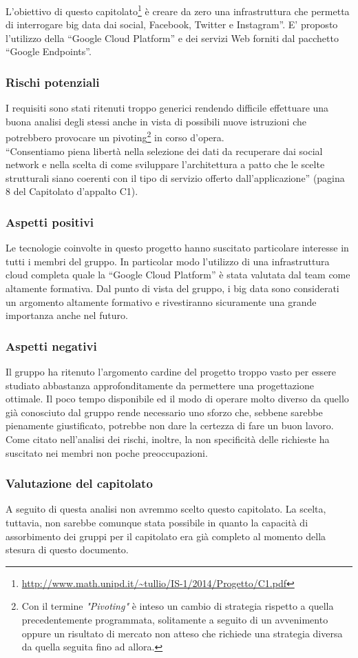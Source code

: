 L’obiettivo di questo capitolato\footnote{\url{http://www.math.unipd.it/~tullio/IS-1/2014/Progetto/C1.pdf}} è creare da zero una infrastruttura che permetta di interrogare big data dai social, Facebook, Twitter e Instagram”.
E’ proposto l’utilizzo della “Google Cloud Platform” e dei servizi Web forniti dal pacchetto “Google Endpoints”. 

\subsubsection{Rischi potenziali}
I requisiti sono stati ritenuti troppo generici  rendendo difficile effettuare una buona analisi degli stessi anche in vista di possibili nuove istruzioni che potrebbero provocare un pivoting\footnote{Con il termine \textit{"Pivoting"} è inteso un cambio di strategia rispetto a quella precedentemente programmata, solitamente a seguito di un avvenimento oppure un risultato di mercato non atteso che richiede una strategia diversa da quella seguita fino ad allora.} in corso d’opera. \\
“Consentiamo piena libertà nella selezione dei dati da recuperare dai social network e nella scelta di come sviluppare l’architettura a patto che le scelte strutturali siano coerenti con il tipo di servizio offerto dall’applicazione” (pagina 8 del Capitolato d'appalto C1).

\subsubsection{Aspetti positivi}
Le tecnologie coinvolte in questo progetto hanno suscitato particolare interesse in tutti i membri del gruppo. In particolar modo l’utilizzo di una infrastruttura cloud completa quale la “Google Cloud Platform” è stata valutata dal team come altamente formativa. Dal punto di vista del gruppo, i big data sono considerati un argomento altamente formativo e rivestiranno sicuramente una grande importanza anche nel futuro.

\subsubsection{Aspetti negativi}
Il gruppo ha ritenuto l’argomento cardine del progetto troppo vasto per essere studiato abbastanza approfonditamente da permettere una progettazione ottimale. Il poco tempo disponibile ed il modo di operare molto diverso da quello già conosciuto dal gruppo rende necessario uno sforzo che, sebbene
sarebbe pienamente giustificato, potrebbe non dare la certezza di fare un buon lavoro.\\
Come citato nell’analisi dei rischi, inoltre, la non specificità delle richieste  ha suscitato nei membri non poche preoccupazioni.


\subsubsection{Valutazione del capitolato} 

A seguito di questa analisi non avremmo scelto questo capitolato. La scelta, tuttavia, non sarebbe comunque stata possibile in quanto la capacità di assorbimento dei gruppi per il capitolato era già completo al momento della stesura di questo documento.
